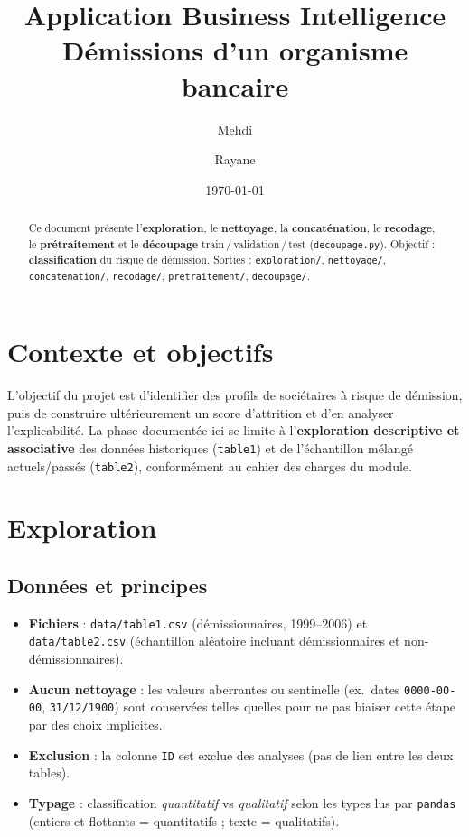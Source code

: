 \documentclass[11pt,a4paper]{article}
\title{Application Business Intelligence\\Démissions d'un organisme bancaire}
\author{Mehdi \and Rayane}
\date{\today}
\begin{document}
\maketitle

\begin{abstract}
Ce document présente l'\textbf{exploration}, le \textbf{nettoyage}, la \textbf{concaténation}, le \textbf{recodage}, le \textbf{prétraitement} et le \textbf{découpage} train\,/\,validation\,/\,test (\texttt{decoupage.py}). Objectif : \textbf{classification} du risque de démission. Sorties : \texttt{exploration/}, \texttt{nettoyage/}, \texttt{concatenation/}, \texttt{recodage/}, \texttt{pretraitement/}, \texttt{decoupage/}.
\end{abstract}

\tableofcontents
\newpage

\section{Contexte et objectifs}

L'objectif du projet est d'identifier des profils de sociétaires à risque de démission, puis de construire ultérieurement un score d'attrition et d'en analyser l'explicabilité. La phase documentée ici se limite à l'\textbf{exploration descriptive et associative} des données historiques (\texttt{table1}) et de l'échantillon mélangé actuels/passés (\texttt{table2}), conformément au cahier des charges du module.

\section{Exploration}

\subsection{Données et principes}

\begin{itemize}[leftmargin=*]
  \item \textbf{Fichiers} : \texttt{data/table1.csv} (démissionnaires, 1999--2006) et \texttt{data/table2.csv} (échantillon aléatoire incluant démissionnaires et non-démissionnaires).
  \item \textbf{Aucun nettoyage} : les valeurs aberrantes ou sentinelle (ex.\ dates \texttt{0000-00-00}, \texttt{31/12/1900}) sont conservées telles quelles pour ne pas biaiser cette étape par des choix implicites.
  \item \textbf{Exclusion} : la colonne \texttt{ID} est exclue des analyses (pas de lien entre les deux tables).
  \item \textbf{Typage} : classification \emph{quantitatif} vs \emph{qualitatif} selon les types lus par \texttt{pandas} (entiers et flottants = quantitatifs ; texte = qualitatifs).
\end{itemize}
\end{document}
